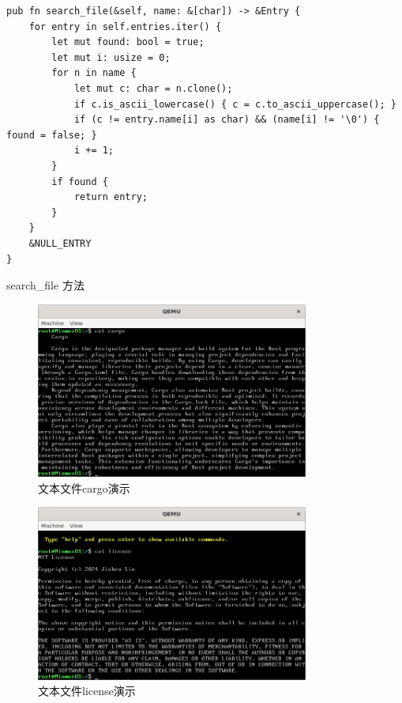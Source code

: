 \begin{listing}[htbp]
    \begin{verbatim}
pub fn search_file(&self, name: &[char]) -> &Entry {
    for entry in self.entries.iter() {
        let mut found: bool = true;
        let mut i: usize = 0;
        for n in name {
            let mut c: char = n.clone();
            if c.is_ascii_lowercase() { c = c.to_ascii_uppercase(); }
            if (c != entry.name[i] as char) && (name[i] != '\0') { found = false; }
            i += 1;
        }
        if found {
            return entry;
        }
    }
    &NULL_ENTRY
}
    \end{verbatim}
    \caption{search\_file 方法}\label{lst:SearchFileMethod}
\end{listing}

\begin{figure}[htbp]
    \centering
    \includegraphics[width=0.8\textwidth]{figures/CargoFilePresentation.png}
    \caption{文本文件cargo演示}
    \label{fig:CargoFilePresentation}
\end{figure}

\begin{figure}[htbp]
    \centering
    \includegraphics[width=0.8\textwidth]{figures/LicenseFilePresentation.png}
    \caption{文本文件license演示}
    \label{fig:LicenseFilePresentation}
\end{figure}


